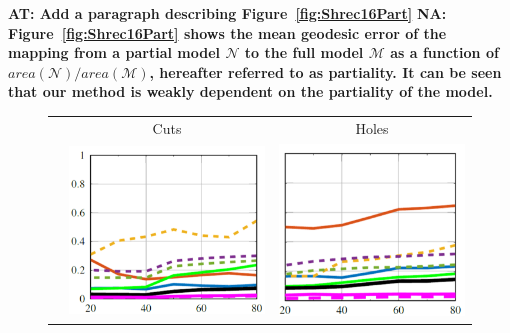 \documentclass[10pt,twocolumn,letterpaper]{article}
\newcommand{\colornote}[3]{{\color{#1}\bf{#2: #3}\normalfont}}
\newcommand{\colornote}[3]{}
\newcommand {\ayellet}[1]{\colornote{blue}{AT}{#1}}
\newcommand {\nadav}[1]{\colornote{red}{NA}{#1}}
\begin{document}
\ayellet{Add a paragraph describing Figure~\ref{fig:Shrec16Part}}
\nadav{Figure~\ref{fig:Shrec16Part} shows the mean geodesic error of the mapping from a partial model $\mathcal{N}$ to the full model $\mathcal{M}$ as a function of $area(\mathcal{N})/area(\mathcal{M})$, hereafter referred to as partiality. It can be seen that our method is weakly dependent on the partiality of the model.}
\begin{figure}[htb]

		\setlength\tabcolsep{0.5pt}
\begin{tabular}{ccc}
	& Cuts & Holes \\
	\rotatebox{90}{Mean Geodesic Error} &
	\includegraphics[scale=0.35]{figures/SHRECCutsPartiality16.png} & \includegraphics[scale=0.35]{figures/SHRECHolesPartiality16.png} \\

\end{tabular}
\end{figure}
\end{document}
